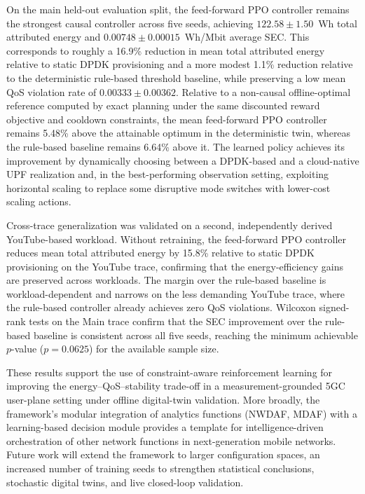 \documentclass[a4paper,fleqn]{cas-sc}
\begin{document}
On the main held-out evaluation split, the feed-forward PPO controller remains the strongest causal controller across five seeds, achieving $122.58 \pm 1.50$~Wh total attributed energy and $0.00748 \pm 0.00015$~Wh/Mbit average SEC. This corresponds to roughly a 16.9\% reduction in mean total attributed energy relative to static DPDK provisioning and a more modest 1.1\% reduction relative to the deterministic rule-based threshold baseline, while preserving a low mean QoS violation rate of $0.00333 \pm 0.00362$. Relative to a non-causal offline-optimal reference computed by exact planning under the same discounted reward objective and cooldown constraints, the mean feed-forward PPO controller remains 5.48\% above the attainable optimum in the deterministic twin, whereas the rule-based baseline remains 6.64\% above it. The learned policy achieves its improvement by dynamically choosing between a DPDK-based and a cloud-native UPF realization and, in the best-performing observation setting, exploiting horizontal scaling to replace some disruptive mode switches with lower-cost scaling actions.

Cross-trace generalization was validated on a second, independently derived YouTube-based workload. Without retraining, the feed-forward PPO controller reduces mean total attributed energy by 15.8\% relative to static DPDK provisioning on the YouTube trace, confirming that the energy-efficiency gains are preserved across workloads. The margin over the rule-based baseline is workload-dependent and narrows on the less demanding YouTube trace, where the rule-based controller already achieves zero QoS violations. Wilcoxon signed-rank tests on the Main trace confirm that the SEC improvement over the rule-based baseline is consistent across all five seeds, reaching the minimum achievable $p$-value ($p=0.0625$) for the available sample size.

These results support the use of constraint-aware reinforcement learning for improving the energy--QoS--stability trade-off in a measurement-grounded 5GC user-plane setting under offline digital-twin validation. More broadly, the framework's modular integration of analytics functions (NWDAF, MDAF) with a learning-based decision module provides a template for intelligence-driven orchestration of other network functions in next-generation mobile networks. Future work will extend the framework to larger configuration spaces, an increased number of training seeds to strengthen statistical conclusions, stochastic digital twins, and live closed-loop validation.
\end{document}
